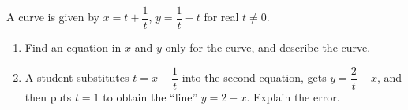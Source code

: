 A curve is given by $x=t+\dfrac{1}{t}$, $y=\dfrac{1}{t}-t$ for real $t\ne0$.
\begin{enumerate}
\item[(a)] Find an equation in $x$ and $y$ only for the curve, and describe the curve.
\item[(b)] A student substitutes $t=x-\dfrac{1}{t}$ into the second equation, gets $y=\dfrac{2}{t}-x$, and then puts $t=1$ to obtain the ``line'' $y=2-x$. Explain the error.
\end{enumerate}
